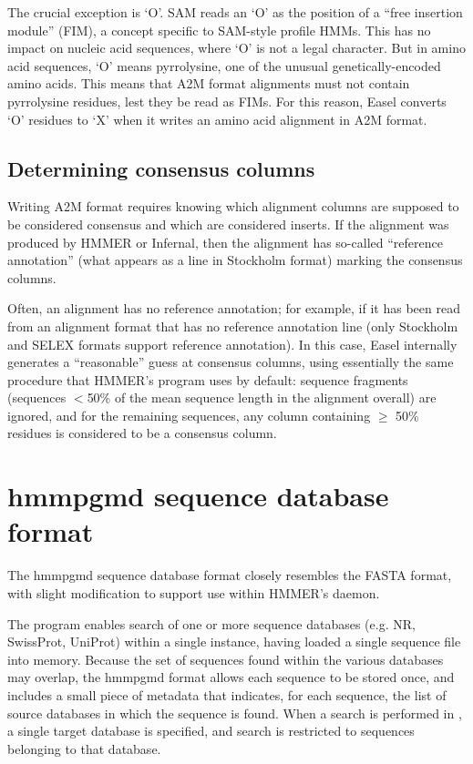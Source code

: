 The crucial exception is `O'. SAM reads an `O' as the position of a
``free insertion module'' (FIM), a concept specific to SAM-style
profile HMMs. This has no impact on nucleic acid sequences, where `O'
is not a legal character. But in amino acid sequences, `O' means
pyrrolysine, one of the unusual genetically-encoded amino acids.  This
means that A2M format alignments must not contain pyrrolysine
residues, lest they be read as FIMs. For this reason, Easel converts
`O' residues to `X' when it writes an amino acid alignment in A2M
format.

\subsection{Determining consensus columns}

Writing A2M format requires knowing which alignment columns are
supposed to be considered consensus and which are considered
inserts. If the alignment was produced by HMMER or Infernal, then the
alignment has so-called ``reference annotation'' (what appears as a
 line in Stockholm format) marking the consensus
columns. 

Often, an alignment has no reference annotation; for example, if it
has been read from an alignment format that has no reference
annotation line (only Stockholm and SELEX formats support reference
annotation). In this case, Easel internally generates a ``reasonable''
guess at consensus columns, using essentially the same procedure that
HMMER's  program uses by default: sequence fragments
(sequences $<$50\% of the mean sequence length in the alignment
overall) are ignored, and for the remaining sequences, any column
containing $\geq$ 50\% residues is considered to be a consensus
column.




\newpage
\section{hmmpgmd sequence database format}

The hmmpgmd sequence database format closely resembles the 
FASTA format, with slight modification to support use within HMMER's
 daemon. 


The  program enables search of one or more sequence 
databases (e.g. NR, SwissProt, UniProt) within a single instance,
having loaded a single sequence file into memory. Because the set of 
sequences found within the various databases may overlap, the hmmpgmd 
format allows each sequence to be stored once, and includes a small piece of
metadata that indicates, for each sequence, the list of source databases in
which the sequence is found. When a search is performed in , a
single target database is specified, and search is restricted to sequences
belonging to that database.

